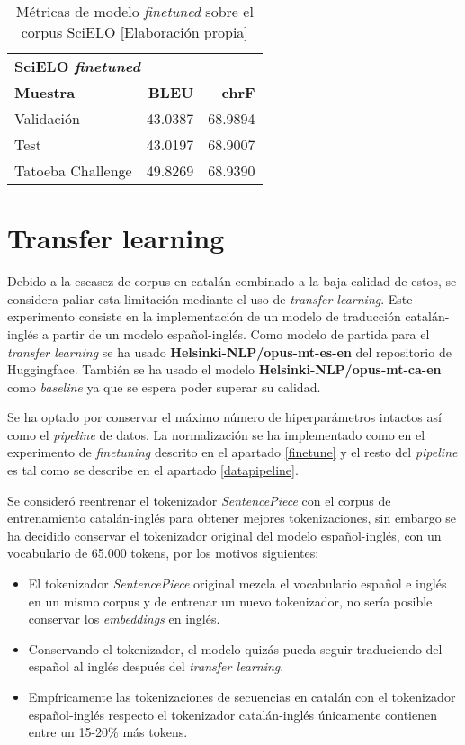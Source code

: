 \begin{table}[H]
    \begin{center}
        \begin{tabular}{ l r r }
        \multicolumn{3}{l}{\textbf{SciELO \textit{finetuned}}}\\
        \textbf{Muestra} & \textbf{BLEU} & \textbf{chrF} \\
        Validación & 43.0387 & 68.9894 \\
        Test & 43.0197 & 68.9007 \\
        Tatoeba Challenge & 49.8269 & 68.9390
        \end{tabular}
        \caption{Métricas de modelo \textit{finetuned} sobre el corpus SciELO [Elaboración propia]}\label{finetunescielo}
    \end{center}
\end{table}


\section{Transfer learning}
Debido a la escasez de corpus en catalán combinado a la baja calidad de estos, se considera paliar esta limitación mediante el uso de \textit{transfer learning}.
Este experimento consiste en la implementación de un modelo de traducción catalán-inglés a partir de un modelo español-inglés.
Como modelo de partida para el \textit{transfer learning} se ha usado \textbf{Helsinki-NLP/opus-mt-es-en} del repositorio de Huggingface. También se ha usado el modelo \textbf{Helsinki-NLP/opus-mt-ca-en} como \textit{baseline} ya que se espera poder superar su calidad.

Se ha optado por conservar el máximo número de hiperparámetros intactos así como el \textit{pipeline} de datos. La normalización se ha implementado como en el experimento de \textit{finetuning} descrito en el apartado \ref{finetune} y el resto del \textit{pipeline} es tal como se describe en el apartado \ref{datapipeline}.

Se consideró reentrenar el tokenizador \textit{SentencePiece} con el corpus de entrenamiento catalán-inglés para obtener mejores tokenizaciones, sin embargo se ha decidido conservar el tokenizador original del modelo español-inglés, con un vocabulario de 65.000 tokens, por los motivos siguientes:
\begin{itemize}
    \item El tokenizador \textit{SentencePiece} original mezcla el vocabulario español e inglés en un mismo corpus y de entrenar un nuevo tokenizador, no sería posible conservar los \textit{embeddings} en inglés.
    \item Conservando el tokenizador, el modelo quizás pueda seguir traduciendo del español al inglés después del \textit{transfer learning}.
    \item Empíricamente las tokenizaciones de secuencias en catalán con el tokenizador español-inglés respecto el tokenizador catalán-inglés únicamente contienen entre un 15-20\% más tokens.
\end{itemize}

